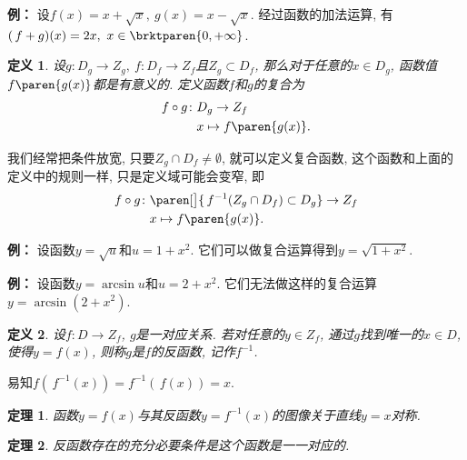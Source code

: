 \documentclass[a4paper,punct=CCT]{ctexbook}
\theoremstyle{break}
\newtheorem*{theorem*}{定理}
\newtheorem*{definition*}{定义}
\newenvironment{example}[1][]{\noindent\textbf{例#1：}}{}
\begin{document}
\begin{example}
  设\(f(x) = x + \sqrt x,\ g(x) = x - \sqrt x\).
  经过函数的加法运算, 有\((\,f+g)(x) = 2x,\ x \in \brktparen{0, +\infty}\).
\end{example}

\begin{definition*}
  设\(g\colon D_g \to Z_g,\ f\colon D_f \to Z_f\)且\(Z_g \subset D_f\), 那么对于任意的\(x \in D_g\), 函数值\(f\paren{g(x)}\)都是有意义的.  定义函数\(f\)和\(g\)的复合为
  \[
    \begin{split}
      f \circ g\colon & D_g \to Z_f \\
      & x \mapsto f\paren{g(x)}.
    \end{split}
  \]
\end{definition*}

我们经常把条件放宽, 只要\(Z_g \cap D_f \ne \emptyset\), 就可以定义复合函数, 这个函数和上面的定义中的规则一样, 只是定义域可能会变窄, 即
\[
  \begin{split}
    f \circ g\colon & \paren[\big]{\,f^{-1}(Z_g \cap D_f) \subset D_g} \to Z_f \\
    & x \mapsto f\paren{g(x)}.
  \end{split}
\]

\begin{example}
  设函数\(y = \sqrt u\)和\(u = 1+x^2\).  它们可以做复合运算得到\(y = \sqrt{1+x^2}\).
\end{example}

\begin{example}
  设函数\(y = \arcsin u\)和\(u = 2+x^2\).  它们无法做这样的复合运算\(y = \arcsin(2+x^2)\).
\end{example}

\begin{definition*}
  设\(f\colon D \to Z_f\), \(g\)是一对应关系.  若对任意的\(y \in Z_f\), 通过\(g\)找到唯一的\(x \in D\), 使得\(y = f(x)\), 则称\(g\)是\(f\)的反函数, 记作\(f^{-1}\).
\end{definition*}

易知\(f(\,f^{-1}(x)) = f^{-1}(\,f(x)) = x\).

\begin{theorem*}
  函数\(y = f(x)\)与其反函数\(y = f^{-1}(x)\)的图像关于直线\(y = x\)对称.
\end{theorem*}

\begin{theorem*}
  反函数存在的充分必要条件是这个函数是一一对应的.
\end{theorem*}
\end{document}
